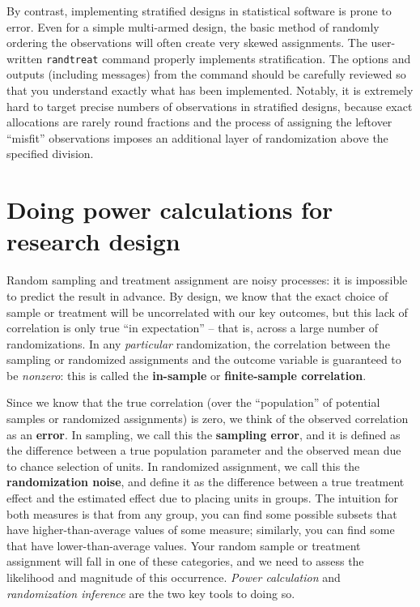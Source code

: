 By contrast, implementing stratified designs in statistical software is prone to error.
Even for a simple multi-armed design, 
the basic method of randomly ordering the observations
will often create very skewed assignments.
The user-written \texttt{randtreat} command properly implements stratification.\cite{carril2017dealing}
The options and outputs (including messages) from the command should be carefully reviewed
so that you understand exactly what has been implemented.
Notably, it is extremely hard to target precise numbers of observations
in stratified designs, because exact allocations are rarely round fractions
and the process of assigning the leftover ``misfit'' observations
imposes an additional layer of randomization above the specified division.


\section{Doing power calculations for research design}

Random sampling and treatment assignment are noisy processes:
it is impossible to predict the result in advance.
By design, we know that the exact choice of sample or treatment
will be uncorrelated with our key outcomes,
but this lack of correlation is only true ``in expectation'' --
that is, across a large number of randomizations.
In any \textit{particular} randomization,
the correlation between the sampling or randomized assignments and the outcome variable
is guaranteed to be \textit{nonzero}:
this is called the \textbf{in-sample} or \textbf{finite-sample correlation}.

Since we know that the true correlation
(over the ``population'' of potential samples or randomized assignments)
is zero, we think of the observed correlation as an \textbf{error}.
In sampling, we call this the \textbf{sampling error},
and it is defined as the difference between a true population parameter
and the observed mean due to chance selection of units.
In randomized assignment, we call this the \textbf{randomization noise},
and define it as the difference between a true treatment effect
and the estimated effect due to placing units in groups.
The intuition for both measures is that from any group,
you can find some possible subsets that have higher-than-average values of some measure;
similarly, you can find some that have lower-than-average values.
Your random sample or treatment assignment will fall in one of these categories,
and we need to assess the likelihood and magnitude of this occurrence.
\textit{Power calculation} and \textit{randomization inference} are the two key tools to doing so.

